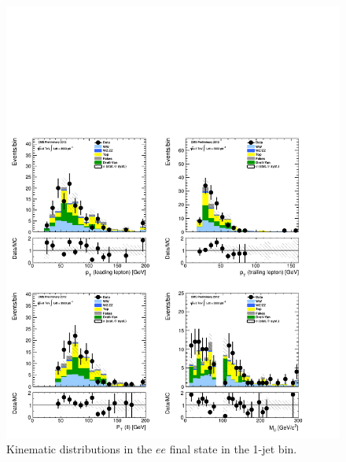 \begin{figure}[!hbtp]
\centering
\includegraphics[width=1\textwidth]{figures/ww_analysis20_0_ALL_ee_1j.pdf}
\caption{Kinematic distributions in the $ee$ final state in the 1-jet bin.}
\label{fig:xs_kinematics_ee_1j}
\end{figure}
